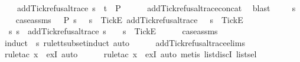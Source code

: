 {\ \ \ \ add{\isacharunderscore}Tick{\isacharunderscore}refusal{\isacharunderscore}trace\ {\isacharparenleft}s\ {\isacharat}\ t{\isacharparenright}\ {\isasymin}\ P{\isachardoublequoteclose}\isanewline
\ \ \ \ \isamarkupfalse%
\ add{\isacharunderscore}Tick{\isacharunderscore}refusal{\isacharunderscore}trace{\isacharunderscore}concat\ \isamarkupfalse%
\ blast\isanewline
{}\isamarkupfalse%
\isanewline
\ \ \isamarkupfalse%
\ {\isasymrho}\ s\isanewline
\ \ \isamarkupfalse%
\ case{\isacharunderscore}assms{\isacharcolon}\ {\isachardoublequoteopen}{\isasymrho}\ {\isasymin}\ P{\isachardoublequoteclose}\ {\isachardoublequoteopen}{\isasymforall}s{\isachardot}\ {\isasymrho}\ {\isasymnoteq}\ s\ {\isacharat}\ {\isacharbrackleft}{\isacharbrackleft}Tick{\isacharbrackright}\isactrlsub E{\isacharbrackright}{\isachardoublequoteclose}\ {\isachardoublequoteopen}add{\isacharunderscore}Tick{\isacharunderscore}refusal{\isacharunderscore}trace\ {\isasymrho}\ {\isacharequal}\ s\ {\isacharat}\ {\isacharbrackleft}{\isacharbrackleft}Tick{\isacharbrackright}\isactrlsub E{\isacharbrackright}{\isachardoublequoteclose}\isanewline
\ \ \isamarkupfalse%
\ {\isachardoublequoteopen}{\isasymexists}\ s{\isacharprime}{\isachardot}\ s\ {\isacharequal}\ add{\isacharunderscore}Tick{\isacharunderscore}refusal{\isacharunderscore}trace\ s{\isacharprime}\ {\isasymand}\ {\isasymrho}\ {\isacharequal}\ s{\isacharprime}\ {\isacharat}\ {\isacharbrackleft}{\isacharbrackleft}Tick{\isacharbrackright}\isactrlsub E{\isacharbrackright}{\isachardoublequoteclose}\isanewline
\ \ \ \ \isamarkupfalse%
\ case{\isacharunderscore}assms{\isacharparenleft}{}{\isacharparenright}\ \isamarkupfalse%
\ {\isacharparenleft}induct\ {\isasymrho}\ s\ rule{\isacharcolon}tt{\isacharunderscore}subset{\isachardot}induct{\isacharcomma}\ auto{\isacharparenright}\isanewline
\ \ \ \ \isamarkupfalse%
\ add{\isacharunderscore}Tick{\isacharunderscore}refusal{\isacharunderscore}trace{\isachardot}elims\ \isamarkupfalse%
\ {\isacharparenleft}rule{\isacharunderscore}tac\ x{\isacharequal}{\isachardoublequoteopen}{\isacharbrackleft}{\isacharbrackright}{\isachardoublequoteclose}\ \ exI{\isacharcomma}\ auto{\isacharparenright}\isanewline
\ \ \ \ \isamarkupfalse%
\ {\isacharparenleft}rule{\isacharunderscore}tac\ x{\isacharequal}{\isachardoublequoteopen}{\isacharbrackleft}{\isacharbrackright}{\isachardoublequoteclose}\ \ exI{\isacharcomma}\ auto{\isacharcomma}\ metis\ list{\isachardot}discI\ list{\isachardot}sel{\isacharparenleft}{}{\isacharparenright}{\isacharparenright}\isanewline
}
